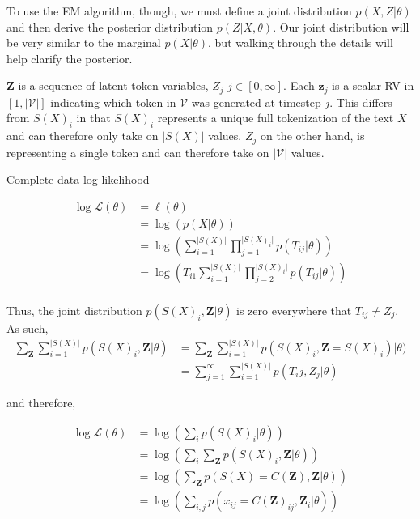 \documentclass[11pt]{article}
\newcommand{\logl}{\ell}
\newcommand{\vect}[1]{\mathbf{#1}}
\begin{document}
To use the EM algorithm, though, we must define a joint distribution $p(X, Z| \theta)$ and then derive the posterior distribution $p(Z|X, \theta)$.
Our joint distribution will be very similar to the marginal $p(X|\theta)$, but walking through the details will help clarify the posterior.


$\vect{Z}$ is a sequence of latent token variables, $Z_j\,\, j \in [0, \infty]$.
Each $\vect{z}_j$ is a scalar RV in $[1,\vert \mathcal{V}\vert]$ indicating which token in $\mathcal{V}$ was generated at
timestep $j$. This differs from $S(X)_i$ in that $S(X)_i$ represents a unique full tokenization of the text $X$ and can therefore only take on $\vert S(X)\vert$ values.
$Z_j$ on the other hand, is representing a single token and can therefore take on $\vert \mathcal{V}\vert$ values.

\vspace{3mm}

Complete data log likelihood

\begin{align*}
\log{\mathcal{L}}(\theta) &= \logl(\theta) \\
                              &= \log(p(X|\theta))\\
                              &= \log(\sum\limits_{i=1}^{\vert S(X)\vert} \prod\limits_{j=1}^{\vert S(X)_i\vert}  p(T_{ij}|\theta))\\
                              &= \log(T_{i1}\sum\limits_{i=1}^{\vert S(X)\vert} \prod\limits_{j=2}^{\vert S(X)_i\vert} p(T_{ij}|\theta))\\
\end{align*}


Thus, the joint distribution $p(S(X)_i, \vect{Z}|\theta)$ is zero everywhere that $T_{ij} \neq Z_j$.
As such, 
\begin{align*}
    \sum\limits_{\vect{Z}}\sum\limits_{i=1}^{\vert S(X)\vert} p(S(X)_i, \vect{Z}|\theta) &= \sum\limits_{\vect{Z}} \sum\limits_{i=1}^{\vert S(X)\vert}p(S(X)_i, \vect{Z} = S(X)_i)  |\theta)\\
                                                                                         &= \sum\limits_{j=1}^\infty \sum\limits_{i=1}^{\vert S(X)\vert}p(T_ij, Z_j|\theta)
\end{align*}

and therefore,

\begin{align*}
\log{\mathcal{L}}(\theta) &= \log(\sum\limits_{i} p(S(X)_i|\theta))\\
                        &= \log(\sum\limits_{i}\sum\limits_{\vect{Z}} p(S(X)_i, \vect{Z}|\theta))\\
                        &= \log(\sum\limits_{\vect{Z}} p(S(X) = C(\vect{Z}), \vect{Z}|\theta))\\
                        &= \log(\sum\limits_{i,j} p(x_{ij} = C(\vect{Z})_{ij}, \vect{Z}_{i}|\theta))\\
\end{align*}
\end{document}
